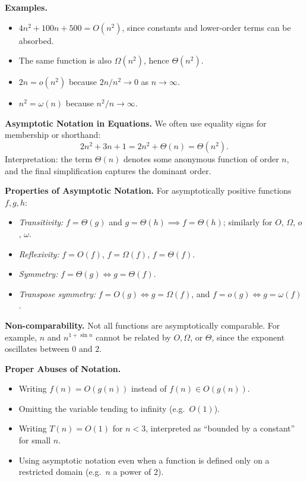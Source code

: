\documentclass[12pt]{article}
\theoremstyle{definition}
\begin{document}
\noindent
\textbf{Examples.}  
\begin{itemize}
    \item $4n^2 + 100n + 500 = O(n^2)$, since constants and lower-order terms can be absorbed.  
    \item The same function is also $\Omega(n^2)$, hence $\Theta(n^2)$.  
    \item $2n = o(n^2)$ because $2n/n^2 \to 0$ as $n \to \infty$.  
    \item $n^2 = \omega(n)$ because $n^2/n \to \infty$.  
\end{itemize}

\noindent
\textbf{Asymptotic Notation in Equations.}  
We often use equality signs for membership or shorthand:
\[
2n^2 + 3n + 1 = 2n^2 + \Theta(n) = \Theta(n^2).
\]
Interpretation: the term $\Theta(n)$ denotes some anonymous function of order $n$, and the final simplification captures the dominant order.

\noindent
\textbf{Properties of Asymptotic Notation.}  
For asymptotically positive functions $f, g, h$:  
\begin{itemize}
    \item \textit{Transitivity:}  
    $f = \Theta(g)$ and $g = \Theta(h) \implies f = \Theta(h)$;  
    similarly for $O$, $\Omega$, $o$, $\omega$.  
    \item \textit{Reflexivity:} $f = O(f)$, $f = \Omega(f)$, $f = \Theta(f)$.  
    \item \textit{Symmetry:} $f = \Theta(g) \iff g = \Theta(f)$.  
    \item \textit{Transpose symmetry:} $f = O(g) \iff g = \Omega(f)$, and $f = o(g) \iff g = \omega(f)$.  
\end{itemize}

\noindent
\textbf{Non-comparability.}  
Not all functions are asymptotically comparable. For example, $n$ and $n^{1+\sin n}$ cannot be related by $O, \Omega$, or $\Theta$, since the exponent oscillates between $0$ and $2$.  

\noindent
\textbf{Proper Abuses of Notation.}  
\begin{itemize}
    \item Writing $f(n) = O(g(n))$ instead of $f(n) \in O(g(n))$.  
    \item Omitting the variable tending to infinity (e.g.\ $O(1)$).  
    \item Writing $T(n) = O(1)$ for $n < 3$, interpreted as “bounded by a constant” for small $n$.  
    \item Using asymptotic notation even when a function is defined only on a restricted domain (e.g.\ $n$ a power of $2$).  
\end{itemize}
\end{document}
